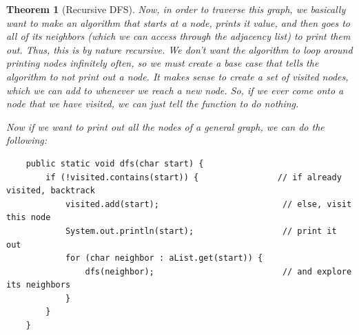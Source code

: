 \documentclass{article}
\newtheorem{theorem}{Theorem}[section]
\theoremstyle{definition}
\theoremstyle{remark}
\theoremstyle{definition}
\begin{document}
\begin{theorem}[Recursive DFS]
Now, in order to traverse this graph, we basically want to make an algorithm that starts at a node, prints it value, and then goes to all of its neighbors (which we can access through the adjacency list) to print them out. Thus, this is by nature recursive. We don't want the algorithm to loop around printing nodes infinitely often, so we must create a base case that tells the algorithm to not print out a node. It makes sense to create a set of visited nodes, which we can add to whenever we reach a new node. So, if we ever come onto a node that we have visited, we can just tell the function to do nothing. 

Now if we want to print out all the nodes of a general graph, we can do the following:
\begin{verbatim}
    public static void dfs(char start) {
        if (!visited.contains(start)) {                // if already visited, backtrack
            visited.add(start);                         // else, visit this node 
            System.out.println(start);                  // print it out
            for (char neighbor : aList.get(start)) {
                dfs(neighbor);                          // and explore its neighbors 
            }
        }
    }   
\end{verbatim}
\end{theorem}
\end{document}
